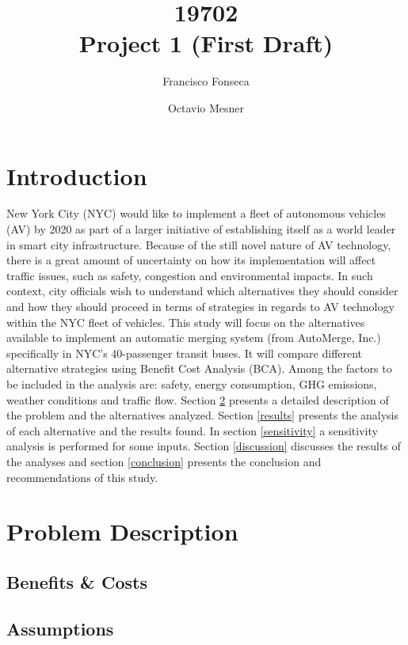 \documentclass[11pt, letterpaper]{article}
\title{\vspace{-2cm} 19702 \\ Project 1 (First Draft)}
\author{Francisco Fonseca \and Octavio Mesner}
\date{\mydate}
\date{\mydateformat\normalsize\mydate} %
\begin{document}
\maketitle %

\section{Introduction} \label{intro}

New York City (NYC) would like to implement a fleet of autonomous vehicles (AV) by 2020 as part of a larger initiative of establishing itself as a world leader in smart city infrastructure. Because of the still novel nature of AV technology, there is a great amount of uncertainty on how its implementation will affect traffic issues, such as safety, congestion and environmental impacts. In such context, city officials wish to understand which alternatives they should consider and how they should proceed in terms of strategies in regards to AV technology within the NYC fleet of vehicles. This study will focus on the alternatives available to implement an automatic merging system (from AutoMerge, Inc.) specifically in NYC's 40-passenger transit buses. It will compare different alternative strategies using Benefit Cost Analysis (BCA). Among the factors to be included in the analysis are: safety, energy consumption, GHG emissions, weather conditions and traffic flow. Section \ref{problem} presents a detailed description of the problem and the alternatives analyzed. Section \ref{results} presents the analysis of each alternative and the results found. In section \ref{sensitivity} a sensitivity analysis is performed for some inputs. Section \ref{discussion} discusses the results of the analyses and section \ref{conclusion} presents the conclusion and recommendations of this study.

\section{Problem Description} \label{problem}

\subsection{Benefits \& Costs}

\subsection{Assumptions}
\end{document}
